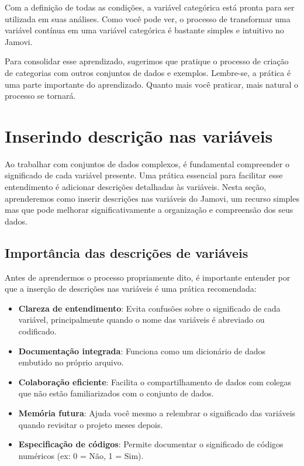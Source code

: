 Com a definição de todas as condições, a variável categórica está pronta para ser utilizada em suas análises. Como você pode ver, o processo de transformar uma variável contínua em uma variável categórica é bastante simples e intuitivo no Jamovi.

Para consolidar esse aprendizado, sugerimos que pratique o processo de criação de categorias com outros conjuntos de dados e exemplos. Lembre-se, a prática é uma parte importante do aprendizado. Quanto mais você praticar, mais natural o processo se tornará.

\section{Inserindo descrição nas variáveis}

Ao trabalhar com conjuntos de dados complexos, é fundamental compreender o significado de cada variável presente. Uma prática essencial para facilitar esse entendimento é adicionar descrições detalhadas às variáveis. Nesta seção, aprenderemos como inserir descrições nas variáveis do Jamovi, um recurso simples mas que pode melhorar significativamente a organização e compreensão dos seus dados.

\subsection{Importância das descrições de variáveis}

Antes de aprendermos o processo propriamente dito, é importante entender por que a inserção de descrições nas variáveis é uma prática recomendada:

\begin{itemize}
    \item \textbf{Clareza de entendimento}: Evita confusões sobre o significado de cada variável, principalmente quando o nome das variáveis é abreviado ou codificado.
    \item \textbf{Documentação integrada}: Funciona como um dicionário de dados embutido no próprio arquivo.
    \item \textbf{Colaboração eficiente}: Facilita o compartilhamento de dados com colegas que não estão familiarizados com o conjunto de dados.
    \item \textbf{Memória futura}: Ajuda você mesmo a relembrar o significado das variáveis quando revisitar o projeto meses depois.
    \item \textbf{Especificação de códigos}: Permite documentar o significado de códigos numéricos (ex: 0 = Não, 1 = Sim).
\end{itemize}

